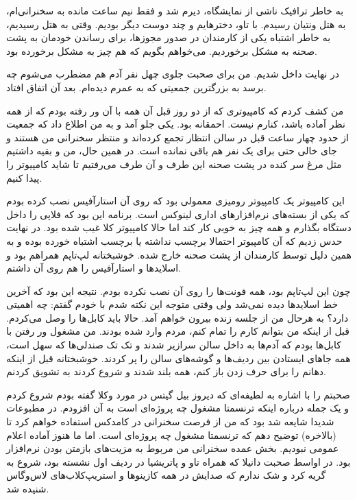 به خاطر ترافیک ناشی از نمایشگاه، دیرم شد و فقط نیم ساعت مانده به
سخنرانی‌ام، به هتل ونتیان رسیدم. با تاو، دخترهایم و چند دوست دیگر
بودیم. وقتی به هتل رسیدیم، به خاطر اشتباه یکی از کارمندان در صدور
مجوزها، برای رساندن خودمان به پشت صحنه به مشکل برخوردیم. می‌خواهم بگویم
که هم چیز به مشکل برخورده بود.

در نهایت داخل شدیم. من برای صحبت جلوی چهل نفر آدم هم مضطرب می‌شوم چه
برسد به بزرگترین جمعیتی که به عمرم دیده‌ام. بعد آن اتفاق افتاد.

من کشف کردم که کامپیوتری که از دو روز قبل آن همه با آن ور رفته بودم که
از همه نظر آماده باشد، کنارم نیست. احمقانه بود. یکی جلو آمد و به من
اطلاع داد که جمعیت از حدود چهار ساعت قبل در سالن انتظار تجمع کرده‌اند و
منتظر سخنرانی من هستند و جای خالی حتی برای یک نفر هم باقی نمانده
است. در همین حال، من و بقیه داشتیم مثل مرغ سر کنده در پشت صحنه این طرف
و آن طرف می‌رفتیم تا شاید کامپیوتر را پیدا کنیم.

این کامپیوتر یک کامپیوتر رومیزی معمولی بود که روی آن
استارآفیس نصب کرده بودم که
یکی از بسته‌های نرم‌افزارهای اداری لینوکس است. برنامه این بود که فلاپی
را داخل دستگاه بگذارم و همه چیز به خوبی کار کند اما حالا کامپیوتر کلا
غیب شده بود. در نهایت حدس زدیم که آن کامپیوتر احتمالا برچسب نداشته یا
برچسب اشتباه خورده بوده و به همین دلیل توسط کارمندان از پشت صحنه خارج
شده. خوشبختانه لپ‌تاپم همراهم بود و اسلایدها و استار‌آفیس را هم روی آن
داشتم.

چون این لپ‌تاپم بود، همه فونت‌ها را روی آن نصب نکرده بودم. نتیجه این بود
که آخرین خط اسلایدها دیده نمی‌شد ولی وقتی متوجه این نکته شدم با خودم
گفتم: چه اهمیتی دارد؟ به هرحال من از جلسه زنده بیرون خواهم آمد. حالا
باید کابل‌ها را وصل می‌کردم. قبل از اینکه من بتوانم کارم را تمام کنم،
مردم وارد شده بودند. من مشغول ور رفتن با کابل‌ها بودم که آدم‌ها به داخل
سالن سرازیر شدند و تک تک صندلی‌ها که سهل است، همه جاهای ایستادن بین
ردیف‌ها و گوشه‌های سالن را پر کردند. خوشبختانه قبل از اینکه دهانم را
برای حرف زدن باز کنم، همه بلند شدند و شروع کردند به تشویق کردنم.

صحبتم را با اشاره به لطیفه‌ای که دیروز بیل گیتس در مورد وکلا گفته بودم
شروع کردم و یک جمله درباره اینکه ترنسمتا مشغول چه پروژه‌ای است به آن
افزودم. در مطبوعات شدیدا شایعه شد بود که من از فرصت سخنرانی در کامدکس
استفاده خواهم کرد تا (بالاخره) توضیح دهم که ترنسمتا مشغول چه پروژه‌ای
است. اما ما هنوز آماده اعلام عمومی نبودیم. بخش عمده سخنرانی من مربوط
به مزیت‌های بازمتن بودن نرم‌افزار بود. در اواسط صحبت دانیلا که همراه تاو
و پاتریشیا در ردیف اول نشسته بود، شروع به گریه کرد و شک ندارم که صدایش
در همه کازینوها و استریپ‌کلاب‌های لاس‌وگاس شنیده شد.

